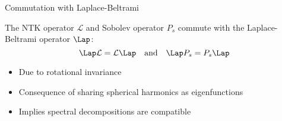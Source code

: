 \begin{frame}{Commutation with Laplace-Beltrami}
\begin{theorem}
The NTK operator $\mathcal{L}$ and Sobolev operator $P_s$ commute with the Laplace-Beltrami operator $\Lap$:
\[ \Lap \mathcal{L} = \mathcal{L} \Lap \quad \text{and} \quad \Lap P_s = P_s \Lap \]
\begin{itemize}
\item Due to rotational invariance
\item Consequence of sharing spherical harmonics as eigenfunctions
\item Implies spectral decompositions are compatible
\end{itemize}
\end{theorem}
\end{frame}